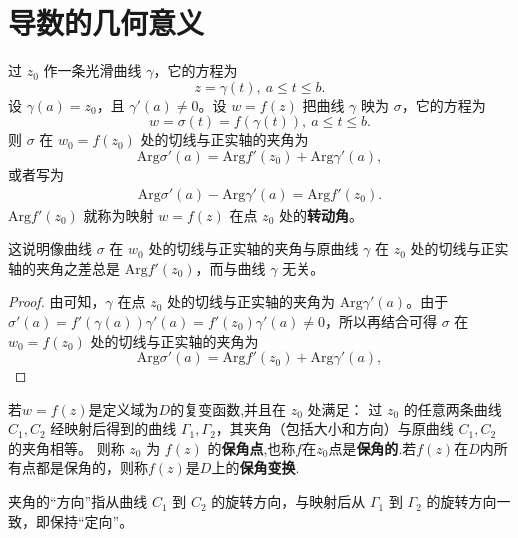 \documentclass[../../main.tex]{subfiles}
\begin{document}
\section{导数的几何意义}

\begin{proposition}
过 \( z_0 \) 作一条光滑曲线 \( \gamma \)，它的方程为  
\[ z = \gamma(t),\ a \leqslant t \leqslant b. \]  
设 \( \gamma(a) = z_0 \)，且 \( \gamma'(a) \neq 0 \)。设 \( w = f(z) \) 把曲线 \( \gamma \) 映为 \( \sigma \)，它的方程为  
\[ w = \sigma(t) = f(\gamma(t)),\ a \leqslant t \leqslant b. \]  
则 \( \sigma \) 在 \( w_0 = f(z_0) \) 处的切线与正实轴的夹角为  
\[ \mathrm{Arg}\sigma'(a) = \mathrm{Arg} f'(z_0) + \mathrm{Arg} \gamma'(a), \]  
或者写为  
\begin{align}
\mathrm{Arg} \sigma'(a) - \mathrm{Arg} \gamma'(a) = \mathrm{Arg} f'(z_0). \label{equation----:::2.1}
\end{align}
\( \mathrm{Arg} f'(z_0) \) 就称为映射 \( w = f(z) \) 在点 \( z_0 \) 处的\textbf{转动角}。
\end{proposition}
\begin{note}
这说明像曲线 \( \sigma \) 在 \( w_0 \) 处的切线与正实轴的夹角与原曲线 \( \gamma \) 在 \( z_0 \) 处的切线与正实轴的夹角之差总是 \( \mathrm{Arg} f'(z_0) \)，而与曲线 \( \gamma \) 无关。
\end{note}
\begin{proof}
由可知，\( \gamma \) 在点 \( z_0 \) 处的切线与正实轴的夹角为 \( \mathrm{Arg} \gamma'(a) \)。由于 \( \sigma'(a) = f'(\gamma(a))\gamma'(a) = f'(z_0)\gamma'(a) \neq 0 \)，所以再结合可得 \( \sigma \) 在 \( w_0 = f(z_0) \) 处的切线与正实轴的夹角为  
\[ \mathrm{Arg}\sigma'(a) = \mathrm{Arg} f'(z_0) + \mathrm{Arg} \gamma'(a), \]  
\end{proof}

\begin{definition}
若\( w = f(z) \)是定义域为$D$的复变函数,并且在 \( z_0 \) 处满足：  
过 \( z_0 \) 的任意两条曲线 \( C_1, C_2 \) 经映射后得到的曲线 \( \Gamma_1, \Gamma_2 \)，其夹角（包括大小和方向）与原曲线 \( C_1, C_2 \) 的夹角相等。  
则称 \( z_0 \) 为 \( f(z) \) 的\textbf{保角点},也称$f$在$z_0$点是\textbf{保角的}.若\(f(z)\)在$D$内所有点都是保角的，则称\(f(z)\)是$D$上的\textbf{保角变换}.
\end{definition}
\begin{remark}
夹角的“方向”指从曲线 \( C_1 \) 到 \( C_2 \) 的旋转方向，与映射后从 \( \Gamma_1 \) 到 \( \Gamma_2 \) 的旋转方向一致，即保持“定向”。
\end{remark}
\end{document}
